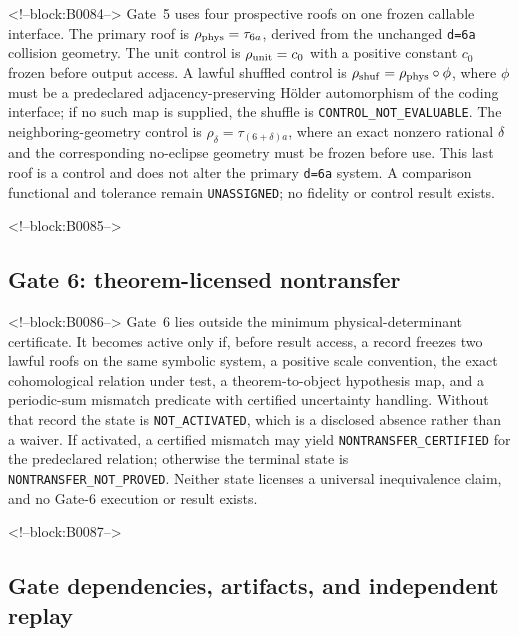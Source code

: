 \documentclass[11pt,a4paper]{article}
\begin{document}
<!--block:B0084-->
Gate~5 uses four prospective roofs on one frozen callable interface. The primary roof is \(\rho_{\rm phys}=\tau_{6a}\), derived from the unchanged \texttt{d=6a} collision geometry. The unit control is \(\rho_{\rm unit}=c_0\) with a positive constant \(c_0\) frozen before output access. A lawful shuffled control is \(\rho_{\rm shuf}=\rho_{\rm phys}\circ\phi\), where \(\phi\) must be a predeclared adjacency-preserving H\"older automorphism of the coding interface; if no such map is supplied, the shuffle is \texttt{CONTROL\_NOT\_EVALUABLE}. The neighboring-geometry control is \(\rho_\delta=\tau_{(6+\delta)a}\), where an exact nonzero rational \(\delta\) and the corresponding no-eclipse geometry must be frozen before use. This last roof is a control and does not alter the primary \texttt{d=6a} system. A comparison functional and tolerance remain \texttt{UNASSIGNED}; no fidelity or control result exists.

<!--block:B0085-->
\subsection{Gate 6: theorem-licensed nontransfer}

<!--block:B0086-->
Gate~6 lies outside the minimum physical-determinant certificate. It becomes active only if, before result access, a record freezes two lawful roofs on the same symbolic system, a positive scale convention, the exact cohomological relation under test, a theorem-to-object hypothesis map, and a periodic-sum mismatch predicate with certified uncertainty handling. Without that record the state is \texttt{NOT\_ACTIVATED}, which is a disclosed absence rather than a waiver. If activated, a certified mismatch may yield \texttt{NONTRANSFER\_CERTIFIED} for the predeclared relation; otherwise the terminal state is \texttt{NONTRANSFER\_NOT\_PROVED}. Neither state licenses a universal inequivalence claim, and no Gate-6 execution or result exists.

<!--block:B0087-->
\subsection{Gate dependencies, artifacts, and independent replay}
\end{document}
